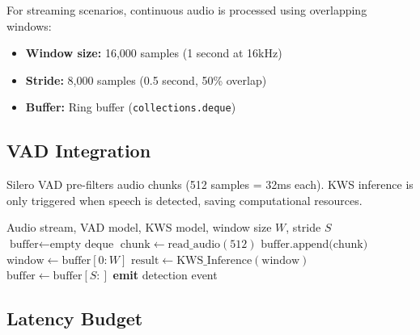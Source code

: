 \documentclass[12pt,a4paper]{report}
\begin{document}
For streaming scenarios, continuous audio is processed using overlapping
windows:

\begin{itemize}
    \item \textbf{Window size:} 16,000 samples (1 second at 16kHz)
    \item \textbf{Stride:} 8,000 samples (0.5 second, 50\% overlap)
    \item \textbf{Buffer:} Ring buffer (\texttt{collections.deque})
\end{itemize}

\subsection{VAD Integration}

Silero VAD pre-filters audio chunks (512 samples = 32ms each). KWS inference
is only triggered when speech is detected, saving computational resources.

\begin{algorithm}[h]
\caption{Streaming KWS with VAD}
\label{alg:streaming}
\begin{algorithmic}[1]
\Require Audio stream, VAD model, KWS model, window size $W$, stride $S$
\State $\text{buffer} \gets \text{empty deque}$
    \State $\text{chunk} \gets \text{read\_audio}(512)$
        \State $\text{buffer.append(chunk)}$
            \State $\text{window} \gets \text{buffer}[0:W]$
            \State $\text{result} \gets \text{KWS\_Inference}(\text{window})$
            \State $\text{buffer} \gets \text{buffer}[S:]$
                \State \textbf{emit} detection event
            \EndIf
        \EndIf
    \EndIf
\EndWhile
\end{algorithmic}
\end{algorithm}

\subsection{Latency Budget}
\end{document}
